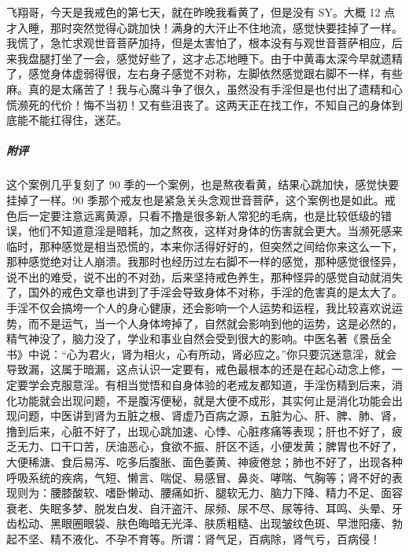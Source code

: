 \begin{case}
    飞翔哥，今天是我戒色的第七天，就在昨晚我看黄了，但是没有 SY。大概 12 点才入睡，那时突然觉得心跳加快！满身的大汗止不住地流，感觉快要挂掉了一样。我慌了，急忙求观世音菩萨加持，但是太害怕了，根本没有与观世音菩萨相应，后来我盘腿打坐了一会，感觉好些了，这才忐忑地睡下。由于中黄毒太深今早就遗精了，感觉身体虚弱得很，左右身子感觉不对称，左脚依然感觉跟右脚不一样，有些麻。真的是太痛苦了！我与心魔斗争了很久，虽然没有手淫但是也付出了遗精和心慌濒死的代价！悔不当初！又有些沮丧了。这两天正在找工作，不知自己的身体到底能不能扛得住，迷茫。
    \subparagraph{附评} 这个案例几乎复刻了 90 季的一个案例，也是熬夜看黄，结果心跳加快，感觉快要挂掉了一样。90 季那个戒友也是紧急关头念观世音菩萨，这个案例也是如此。戒色后一定要注意远离黄源，只看不撸是很多新人常犯的毛病，也是比较低级的错误，他们不知道意淫是暗耗，加之熬夜，这样对身体的伤害就会更大。当濒死感来临时，那种感觉是相当恐慌的，本来你活得好好的，但突然之间给你来这么一下，那种感觉绝对让人崩溃。我那时也经历过左右脚不一样的感觉，那种感觉很怪异，说不出的难受，说不出的不对劲，后来坚持戒色养生，那种怪异的感觉自动就消失了，国外的戒色文章也讲到了手淫会导致身体不对称，手淫的危害真的是太大了。手淫不仅会搞垮一个人的身心健康，还会影响一个人运势和运程，我比较喜欢说运势，而不是运气，当一个人身体垮掉了，自然就会影响到他的运势，这是必然的，精气神没了，脑力没了，学业和事业自然会受到很大的影响。中医名著《景岳全书》中说：“心为君火，肾为相火，心有所动，肾必应之。”你只要沉迷意淫，就会导致漏，这属于暗漏，这点认识一定要有，戒色最根本的还是在起心动念上修，一定要学会克服意淫。有相当觉悟和自身体验的老戒友都知道，手淫伤精到后来，消化功能就会出现问题，不是腹泻便秘，就是大便不成形，其实何止是消化功能会出现问题，中医讲到肾为五脏之根、肾虚乃百病之源，五脏为心、肝、脾、肺、肾，撸到后来，心脏不好了，出现心跳加速、心悸、心脏疼痛等表现；肝也不好了，疲乏无力、口干口苦，厌油恶心，食欲不振、肝区不适，小便发黄；脾胃也不好了，大便稀溏、食后易泻、吃多后腹胀、面色萎黄、神疲倦怠；肺也不好了，出现各种呼吸系统的疾病，气短、懒言、喘促、易感冒、鼻炎、哮喘、气胸等；肾不好的表现则为：腰膝酸软、嗜卧懒动、腰痛如折、腿软无力、脑力下降、精力不足、面容衰老、失眠多梦、脱发白发、自汗盗汗、尿频、尿不尽、尿等待、耳鸣、头晕、牙齿松动、黑眼圈眼袋、肤色晦暗无光泽、肤质粗糙、出现皱纹色斑、早泄阳痿、勃起不坚、精不液化、不孕不育等。所谓：肾气足，百病除，肾气亏，百病侵！
\end{case}

